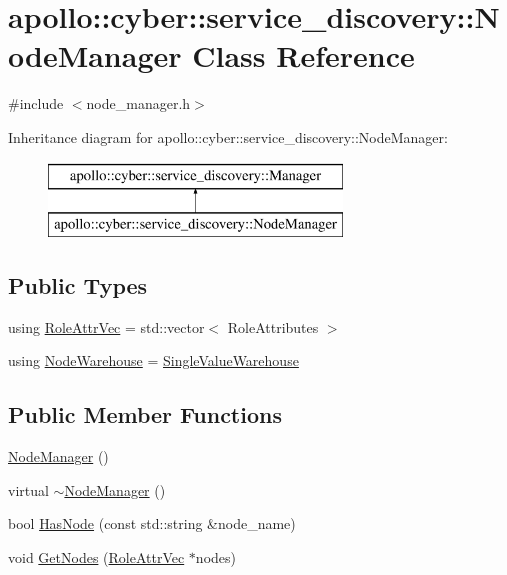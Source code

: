 \hypertarget{classapollo_1_1cyber_1_1service__discovery_1_1NodeManager}{\section{apollo\-:\-:cyber\-:\-:service\-\_\-discovery\-:\-:Node\-Manager Class Reference}
\label{classapollo_1_1cyber_1_1service__discovery_1_1NodeManager}
}


{\ttfamily \#include $<$node\-\_\-manager.\-h$>$}

Inheritance diagram for apollo\-:\-:cyber\-:\-:service\-\_\-discovery\-:\-:Node\-Manager\-:\begin{figure}[H]
\begin{center}
\leavevmode
\includegraphics[height=2.000000cm]{classapollo_1_1cyber_1_1service__discovery_1_1NodeManager}
\end{center}
\end{figure}
\subsection*{Public Types}
\begin{DoxyCompactItemize}
\item 
using \hyperlink{classapollo_1_1cyber_1_1service__discovery_1_1NodeManager_a796b7cfdc0e321399e31300f224d80e0}{Role\-Attr\-Vec} = std\-::vector$<$ Role\-Attributes $>$
\item 
using \hyperlink{classapollo_1_1cyber_1_1service__discovery_1_1NodeManager_a3482319db4df86634ca8459c794c3d0e}{Node\-Warehouse} = \hyperlink{classapollo_1_1cyber_1_1service__discovery_1_1SingleValueWarehouse}{Single\-Value\-Warehouse}
\end{DoxyCompactItemize}
\subsection*{Public Member Functions}
\begin{DoxyCompactItemize}
\item 
\hyperlink{classapollo_1_1cyber_1_1service__discovery_1_1NodeManager_aba168c7a1303300bfd95e5754583f38f}{Node\-Manager} ()
\item 
virtual \hyperlink{classapollo_1_1cyber_1_1service__discovery_1_1NodeManager_a22460c63286ab14c9610248e3d989a7c}{$\sim$\-Node\-Manager} ()
\item 
bool \hyperlink{classapollo_1_1cyber_1_1service__discovery_1_1NodeManager_a90bd5fcc2d6bce0c78a27bd421262bf8}{Has\-Node} (const std\-::string \&node\-\_\-name)
\item 
void \hyperlink{classapollo_1_1cyber_1_1service__discovery_1_1NodeManager_a13ef3fdcf4c138dd984e0cfc1089ae3a}{Get\-Nodes} (\hyperlink{classapollo_1_1cyber_1_1service__discovery_1_1NodeManager_a796b7cfdc0e321399e31300f224d80e0}{Role\-Attr\-Vec} $\ast$nodes)
\end{DoxyCompactItemize}
